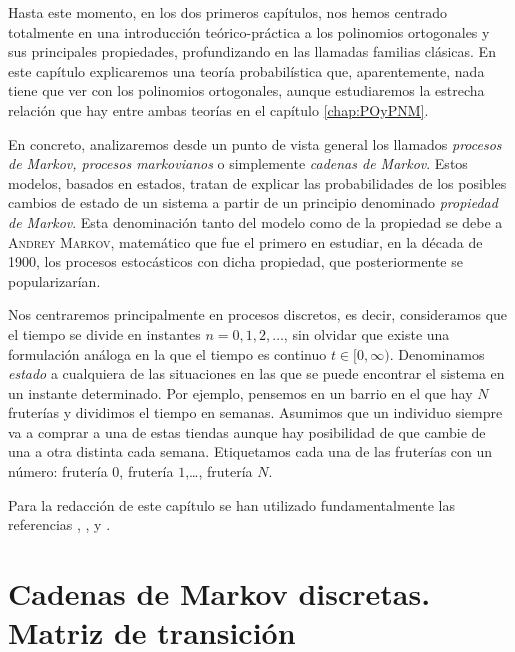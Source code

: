 %
%

Hasta este momento, en los dos primeros capítulos, nos hemos centrado totalmente en una introducción teórico-práctica a los polinomios ortogonales y sus principales propiedades, profundizando en las llamadas familias clásicas. En este capítulo explicaremos una teoría probabilística que, aparentemente, nada tiene que ver con los polinomios ortogonales, aunque estudiaremos la estrecha relación que hay entre ambas teorías en el capítulo \ref{chap:POyPNM}.

En concreto, analizaremos desde un punto de vista general los llamados \textit{procesos de Markov, procesos markovianos} o simplemente \textit{cadenas de Markov}. Estos modelos, basados en estados, tratan de explicar las probabilidades de los posibles cambios de estado de un sistema a partir de  un principio denominado \textit{propiedad de Markov}. Esta denominación tanto del modelo como de la propiedad se debe a \textsc{Andrey Markov}, matemático que fue el primero en estudiar, en la década de 1900, los procesos estocásticos con dicha propiedad, que posteriormente se popularizarían.

Nos centraremos principalmente en procesos discretos, es decir, consideramos que el tiempo se divide en instantes $n=0,1,2,\dots$, sin olvidar que existe una formulación análoga en la que el tiempo es continuo $t\in[0,\infty)$. Denominamos \textit{estado} a cualquiera de las situaciones en las que se puede encontrar el sistema en un instante determinado. Por ejemplo, pensemos en un barrio en el que hay $N$ fruterías y dividimos el tiempo en semanas. Asumimos que un individuo siempre va a comprar a una de estas tiendas aunque hay posibilidad de que cambie de una a otra distinta cada semana. Etiquetamos cada una de las fruterías con un número: frutería $0$, frutería $1$,\dots, frutería $N$.

Para la redacción de este capítulo se han utilizado fundamentalmente las referencias \cite[Ch. IV]{Ross}, \cite[Ch. II]{schoutens-2000}, \cite[Ch. II]{kulkarni-2012} y \cite[Ch. II, Section 2.1]{Manuel}.

\section{Cadenas de Markov discretas. Matriz de transición}

